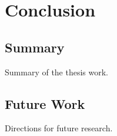 \chapter{Conclusion}

\section{Summary}

Summary of the thesis work.

\section{Future Work}

Directions for future research.
